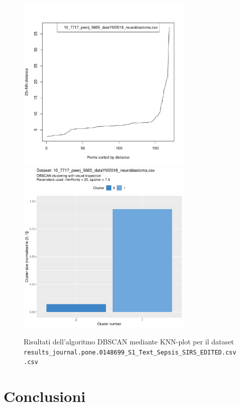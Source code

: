 \documentclass[12pt]{report}
\begin{document}
			\begin{figure}[h]
				\centering
				\includegraphics[width = 0.75\textwidth, height = 0.45\textheight, page = 5]{
					doc/DBSCAN_optimal_MinPts.pdf
				}
				\includegraphics[width = 0.75\textwidth, height = 0.45\textheight, page = 5]{
					results/DBSCAN_visual_comparison.pdf
				}
				\caption{Risultati dell'algoritmo DBSCAN mediante KNN-plot per il dataset
				\texttt{results\_journal.pone.0148699\_S1\_Text\_Sepsis\_SIRS\_EDITED.csv.csv}}
				\label{fig:dbscan-extra5}
			\end{figure}

	\chapter{Conclusioni}
\end{document}

